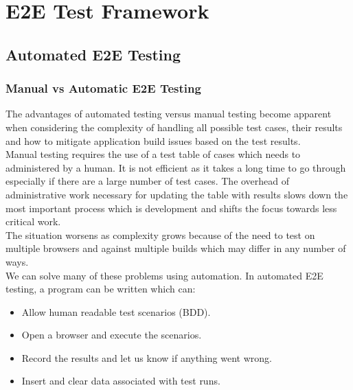 \chapter{E2E Test Framework}
\label{chap:e2e-test-framework}

\section{Automated E2E Testing}
\label{sec:automated-e2e-testing}

\subsection{Manual vs Automatic E2E Testing}
\label{sec:manual-vs-automatic-e2e-testing}

The advantages of automated testing versus manual testing become apparent when considering the complexity of handling all possible test cases, their results and how to mitigate application build issues based on the test results.
\\

Manual testing requires the use of a test table of cases which needs to administered by a human. It is not efficient as it takes a long time to go through especially if there are a large number of test cases. The overhead of administrative work necessary for updating the table with results slows down the most important process which is development and shifts the focus towards less critical work.
\\

The situation worsens as complexity grows because of the need to test on multiple browsers and against multiple builds which may differ in any number of ways.
\\

We can solve many of these problems using automation. In automated E2E testing, a program can be written which can:

\begin{itemize}
\item Allow human readable test scenarios (BDD).
\item Open a browser and execute the scenarios.
\item Record the results and let us know if anything went wrong.
\item Insert and clear data associated with test runs.
\end{itemize}

